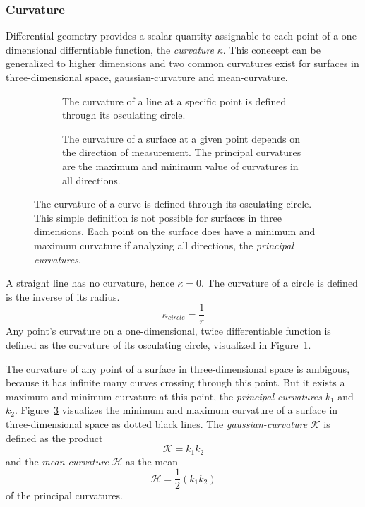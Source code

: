 \subsubsection{Curvature}

Differential geometry provides a scalar quantity\cite{Kuhnel2008} assignable to each point of a one-dimensional differntiable function, the \emph{curvature} $\kappa$.
This conecept can be generalized to higher dimensions and two common curvatures exist for surfaces in three-dimensional space, \gls{gaussian-curvature} and \gls{mean-curvature}.
\begin{figure}[H]
    \begin{subfigure}[t]{0.47\textwidth}
        \scalebox{0.9}{%
        
        }
        \caption{The curvature of a line at a specific point is defined through its osculating circle.}\label{fig:osculating_circle}
    \end{subfigure}
    \begin{subfigure}[t]{0.47\textwidth}
        \scalebox{0.9}{%
        
        }
        \caption[Visualization of curvature for curves and surfaces]{The curvature of a surface at a given point depends on the direction of measurement. The principal curvatures are the maximum and minimum value of curvatures in all directions.}\label{fig:curvature_surface}
    \end{subfigure}
    \caption[Curvature of Curves and Surfaces]{The curvature of a curve is defined through its osculating circle. This simple definition is not possible for surfaces in three dimensions. Each point on the surface does have a minimum and maximum curvature if analyzing all directions, the \emph{principal curvatures}.}
\end{figure}
A straight line has no curvature, hence $\kappa = 0$.
The curvature of a circle is defined is the inverse of its radius.
\begin{equation}
    \kappa_{circle} = \frac{1}{r}
\end{equation}
Any point's curvature on a one-dimensional, twice differentiable function is defined as the curvature of its osculating circle, visualized in Figure~\ref{fig:osculating_circle}.

The curvature of any point of a surface in three-dimensional space is ambigous, because it has infinite many curves crossing through this point.
But it exists a maximum and minimum curvature at this point, the \emph{principal curvatures} $k_1$ and $k_2$.
Figure~\ref{fig:curvature_surface} visualizes the minimum and maximum curvature of a surface in three-dimensional space as dotted black lines.
The \emph{\Gls{gaussian-curvature}} $\mathcal{K}$ is defined as the product
\[
    \mathcal{K} = k_1 k_2
\]
and the \emph{\Gls{mean-curvature}} $\mathcal{H}$ as the mean
\[
    \mathcal{H} = \frac{1}{2} (k_1 k_2)
\]
of the principal curvatures.

